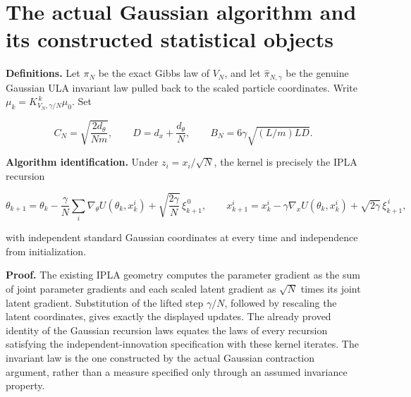 \documentclass[11pt,a4paper]{article}
\begin{document}
\section{\texorpdfstring{The actual Gaussian algorithm and its constructed statistical objects}{The actual Gaussian algorithm and its constructed statistical objects}}


\textbf{Definitions.} Let \(\pi_N\) be the exact Gibbs law of \(V_N\), and let \(\widehat\pi_{N,\gamma}\) be the genuine Gaussian ULA invariant law pulled back to the scaled particle coordinates. Write \(\mu_k=K_{V_N,\gamma/N}^{\,k}\mu_0\). Set

\[C_N=\sqrt{\frac{2d_\theta}{Nm}},\qquad D=d_x+\frac{d_\theta}{N},\qquad B_N=6\gamma\sqrt{(L/m)LD}.\]


\textbf{Algorithm identification.} Under \(z_i=x_i/\sqrt N\), the kernel is precisely the IPLA recursion

\[\theta_{k+1}=\theta_k-\frac\gamma N\sum_i\nabla_\theta U(\theta_k,x_k^i)+\sqrt{\frac{2\gamma}{N}}\,\xi_{k+1}^{\,0},\qquad x_{k+1}^i=x_k^i-\gamma\nabla_xU(\theta_k,x_k^i)+\sqrt{2\gamma}\,\xi_{k+1}^{\,i},\]


with independent standard Gaussian coordinates at every time and independence from initialization.




\textbf{Proof.} The existing IPLA geometry computes the parameter gradient as the sum of joint parameter gradients and each scaled latent gradient as \(\sqrt N\) times its joint latent gradient. Substitution of the lifted step \(\gamma/N\), followed by rescaling the latent coordinates, gives exactly the displayed updates. The already proved identity of the Gaussian recursion laws equates the laws of every recursion satisfying the independent-innovation specification with these kernel iterates. The invariant law is the one constructed by the actual Gaussian contraction argument, rather than a measure specified only through an assumed invariance property.
\end{document}
